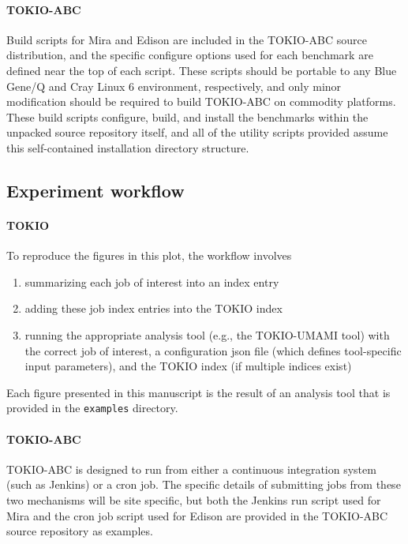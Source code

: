 \paragraph{TOKIO-ABC} Build scripts for Mira and Edison are included in the TOKIO-ABC source distribution, and the specific configure options used for each benchmark are defined near the top of each script.
These scripts should be portable to any Blue Gene/Q and Cray Linux 6 environment, respectively, and only minor modification should be required to build TOKIO-ABC on commodity platforms.
These build scripts configure, build, and install the benchmarks within the unpacked source repository itself, and all of the utility scripts provided assume this self-contained installation directory structure.

\subsection{Experiment workflow}

\paragraph{TOKIO}
To reproduce the figures in this plot, the workflow involves

\begin{enumerate}
\item summarizing each job of interest into an index entry
\item adding these job index entries into the TOKIO index
\item running the appropriate analysis tool (e.g., the TOKIO-UMAMI tool) with the correct job of interest, a configuration json file (which defines tool-specific input parameters), and the TOKIO index (if multiple indices exist)
\end{enumerate}

Each figure presented in this manuscript is the result of an analysis tool that is provided in the \texttt{examples} directory.

\paragraph{TOKIO-ABC}
TOKIO-ABC is designed to run from either a continuous integration system (such as Jenkins) or a cron job.
The specific details of submitting jobs from these two mechanisms will be site specific, but both the Jenkins run script used for Mira and the cron job script used for Edison are provided in the TOKIO-ABC source repository as examples.


